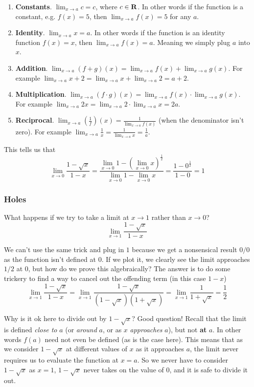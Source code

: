 \begin{enumerate}
    \item \textbf{Constants}. $\lim_{x\to a}c=c$, where $c\in\mathbf{R}$. In other words if the function is a constant, e.g. $f(x)=5$, then $\lim_{x\to a}f(x)=5$ for any $a$.
    \item \textbf{Identity}. $\lim_{x\to a}x=a$. In other words if the function is an identity function $f(x)=x$, then $\lim_{x\to a}f(x)=a$. Meaning we simply plug $a$ into $x$.
    \item \textbf{Addition}. $\lim_{x\to a}(f+g)(x)=\lim_{x\to a}f(x)+\lim_{x\to a}g(x)$. For example $\lim_{x\to a}x+2=\lim_{x\to a}x+\lim_{x\to a}2=a+2$.
    \item \textbf{Multiplication}. $\lim_{x\to a}(f\cdot g)(x)=\lim_{x\to a}f(x)\cdot \lim_{x\to a}g(x)$. For example $\lim_{x\to a}2x=\lim_{x\to a}2\cdot \lim_{x\to a}x=2a$.
    \item \textbf{Reciprocal}. $\lim_{x\to a}\left(\frac{1}{f}\right)(x)=\frac{1}{\lim_{x\to a}f(x)}$ (when the denominator isn't zero). For example $\lim_{x\to a}\frac{1}{x}=\frac{1}{\lim_{x\to a}x}=\frac{1}{a}$.
\end{enumerate}

This tells us that
\[\lim_{x\to 0}\frac{1-\sqrt{x}}{1-x}=\frac{\lim_{x\to 0}1-(\lim_{x\to 0}x)^{\frac{1}{2}}}{\lim_{x\to 0}1-\lim_{x\to 0}x}=\frac{1-0^{\frac{1}{2}}}{1-0}=1\]

\subsubsection{Holes}

What happens if we try to take a limit at $x\to 1$ rather than $x\to 0$?
\[\lim_{x\to 1}\frac{1-\sqrt{x}}{1-x}\]

We can't use the same trick and plug in $1$ because we get a nonsensical result $0/0$ as the function isn't defined at $0$. If we plot it, we clearly see the limit approaches $1/2$ at $0$, but how do we prove this algebraically? The answer is to do some trickery to find a way to cancel out the offending term (in this case $1-x$)
\[\lim_{x\to 1}\frac{1-\sqrt{x}}{1-x}=\lim_{x\to 1}\frac{1-\sqrt{x}}{(1-\sqrt{x})(1+\sqrt{x})}=\lim_{x\to 1}\frac{1}{1+\sqrt{x}}=\frac{1}{2}\]

\vs

Why is it ok here to divide out by $1-\sqrt{x}$? Good question! Recall that the limit is defined \textit{close to} $a$ (or \textit{around} $a$, or as $x$ \textit{approaches} $a$), but not \textbf{at} $a$. In other words $f(a)$ need not even be defined (as is the case here). This means that as we consider $1-\sqrt{x}$ at different values of $x$ as it approaches $a$, the limit never requires us to evaluate the function at $x=a$. So we never have to consider $1-\sqrt{x}$ as $x=1$, $1-\sqrt{x}$ never takes on the value of $0$, and it is safe to divide it out.

